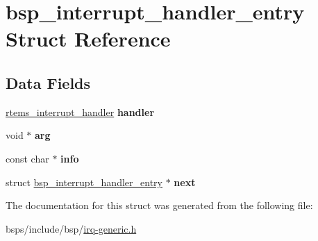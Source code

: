 \hypertarget{structbsp__interrupt__handler__entry}{}\section{bsp\+\_\+interrupt\+\_\+handler\+\_\+entry Struct Reference}
\label{structbsp__interrupt__handler__entry}
\subsection*{Data Fields}
\begin{DoxyCompactItemize}
\item 
\mbox{\label{structbsp__interrupt__handler__entry_a073aba388b98277853ec82b5669ee212}} 
\mbox{\hyperlink{group__rtems__interrupt__extension_gab39bd096ab2c3b41d03dace0e9777b08}{rtems\+\_\+interrupt\+\_\+handler}} {\bfseries handler}
\item 
\mbox{\label{structbsp__interrupt__handler__entry_abdf0bb449f516bf9015b9731c3ca6fcd}} 
void $\ast$ {\bfseries arg}
\item 
\mbox{\label{structbsp__interrupt__handler__entry_ad74e8177d4a209e73c26846dca79b6db}} 
const char $\ast$ {\bfseries info}
\item 
\mbox{\label{structbsp__interrupt__handler__entry_ac8417640acaf5cc5205a890259b11185}} 
struct \mbox{\hyperlink{structbsp__interrupt__handler__entry}{bsp\+\_\+interrupt\+\_\+handler\+\_\+entry}} $\ast$ {\bfseries next}
\end{DoxyCompactItemize}


The documentation for this struct was generated from the following file\+:\begin{DoxyCompactItemize}
\item 
bsps/include/bsp/\mbox{\hyperlink{irq-generic_8h}{irq-\/generic.\+h}}\end{DoxyCompactItemize}

